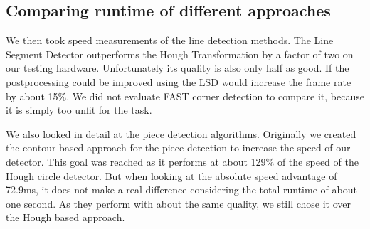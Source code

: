 	\subsection{Comparing runtime of different approaches}
	\label{evaluation-speed-approaches}
	We then took speed measurements of the line detection methods. The Line Segment Detector outperforms the Hough Transformation by a factor of two on our testing hardware. Unfortunately its quality is also only half as good. If the postprocessing could be improved using the LSD would increase the frame rate by about 15\%. We did not evaluate FAST corner detection to compare it, because it is simply too unfit for the task.

	We also looked in detail at the piece detection algorithms. Originally we created the contour based approach for the piece detection to increase the speed of our detector. This goal was reached as it performs at about 129\% of the speed of the Hough circle detector. But when looking at the absolute speed advantage of 72.9ms, it does not make a real difference considering the total runtime of about one second. As they perform with about the same quality, we still chose it over the Hough based approach.

